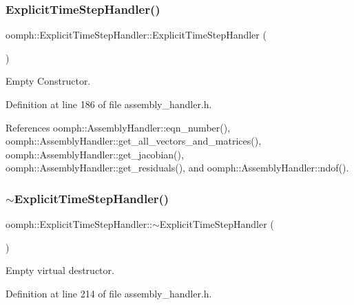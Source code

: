 \subsubsection{\texorpdfstring{Explicit\+Time\+Step\+Handler()}{ExplicitTimeStepHandler()}}
{\footnotesize\ttfamily oomph\+::\+Explicit\+Time\+Step\+Handler\+::\+Explicit\+Time\+Step\+Handler (\begin{DoxyParamCaption}{ }\end{DoxyParamCaption})\hspace{0.3cm}{\ttfamily [inline]}}



Empty Constructor. 



Definition at line 186 of file assembly\+\_\+handler.\+h.



References oomph\+::\+Assembly\+Handler\+::eqn\+\_\+number(), oomph\+::\+Assembly\+Handler\+::get\+\_\+all\+\_\+vectors\+\_\+and\+\_\+matrices(), oomph\+::\+Assembly\+Handler\+::get\+\_\+jacobian(), oomph\+::\+Assembly\+Handler\+::get\+\_\+residuals(), and oomph\+::\+Assembly\+Handler\+::ndof().

\mbox{\label{classoomph_1_1ExplicitTimeStepHandler_a183f40bf18428256a5097f95560f7c5e}} 
\subsubsection{\texorpdfstring{$\sim$\+Explicit\+Time\+Step\+Handler()}{~ExplicitTimeStepHandler()}}
{\footnotesize\ttfamily oomph\+::\+Explicit\+Time\+Step\+Handler\+::$\sim$\+Explicit\+Time\+Step\+Handler (\begin{DoxyParamCaption}{ }\end{DoxyParamCaption})\hspace{0.3cm}{\ttfamily [inline]}}



Empty virtual destructor. 



Definition at line 214 of file assembly\+\_\+handler.\+h.



